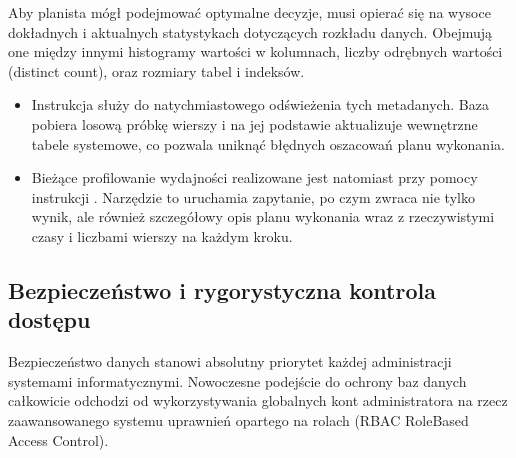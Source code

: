 \documentclass[letterpaper,10pt,english]{sphinxmanual}
\begin{document}
\sphinxAtStartPar
Aby planista mógł podejmować optymalne decyzje, musi opierać się na wysoce dokładnych i aktualnych statystykach dotyczących rozkładu danych. Obejmują one między innymi histogramy wartości w kolumnach, liczby odrębnych wartości (distinct count), oraz rozmiary tabel i indeksów.
\begin{itemize}
\item {} 
\sphinxAtStartPar
Instrukcja  służy do natychmiastowego odświeżenia tych metadanych. Baza pobiera losową próbkę wierszy i na jej podstawie aktualizuje wewnętrzne tabele systemowe, co pozwala uniknąć błędnych oszacowań planu wykonania.

\item {} 
\sphinxAtStartPar
Bieżące profilowanie wydajności realizowane jest natomiast przy pomocy instrukcji . Narzędzie to uruchamia zapytanie, po czym zwraca nie tylko wynik, ale również szczegółowy opis planu wykonania wraz z rzeczywistymi czasy i liczbami wierszy na każdym kroku.

\end{itemize}

\begin{sphinxVerbatim}[commandchars=\\\{\}]
\end{sphinxVerbatim}


\subsection{Bezpieczeństwo i rygorystyczna kontrola dostępu}
\label{\detokenize{rozdzial_2/rozdzial_23/index:bezpieczenstwo-i-rygorystyczna-kontrola-dostepu}}
\sphinxAtStartPar
Bezpieczeństwo danych stanowi absolutny priorytet każdej administracji systemami informatycznymi. Nowoczesne podejście do ochrony baz danych całkowicie odchodzi od wykorzystywania globalnych kont administratora na rzecz zaawansowanego systemu uprawnień opartego na rolach (RBAC \textendash{} Role\sphinxhyphen{}Based Access Control).
\end{document}
